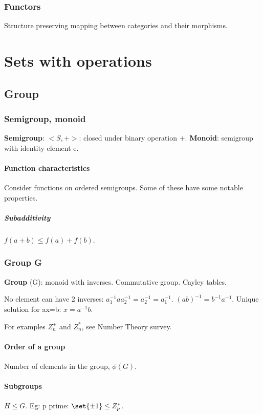 \documentclass[oneside, article]{memoir}
\begin{document}
\section{Functors}
Structure preserving mapping between categories and their morphisms.

\part{Sets with operations}
\chapter{Group}
\section{Semigroup, monoid}
\textbf{Semigroup}: $<S,+>$: closed under binary operation +. \textbf{Monoid}: semigroup with identity element e.

\subsection{Function characteristics}
Consider functions on ordered semigroups. Some of these have some notable properties.

\subsubsection{Subadditivity}
$f(a + b) \leq f(a) + f(b)$.

\section{Group G}
\textbf{Group} (G): monoid with inverses. Commutative group. Cayley tables.

No element can have 2 inverses: $a_1^{-1}aa_2^{-1} = a_2^{-1} = a_1^{-1}$. $(ab)^{-1} = b^{-1}a^{-1}$. Unique solution for ax=b: $x=a^{-1}b$.

For examples $Z_{n}^{+}$ and $Z_{n}^{*}$, see Number Theory survey.

\subsection{Order of a group}
Number of elements in the group, $\phi(G)$.

\subsection{Subgroups}
$H \leq G$. Eg: p prime: $\set{\pm 1} \leq Z_{p}^{*}$.
\end{document}
